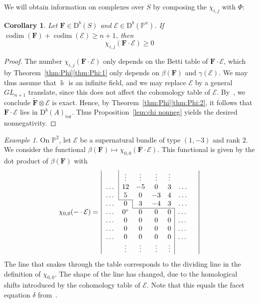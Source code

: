\documentclass[12pt]{amsart}
\newtheorem{cor}[lemma]{Corollary}
\theoremstyle{definition}
\theoremstyle{remark}
\newtheorem{example}[lemma]{Example}
\newcommand{\kk}{\Bbbk}
\newcommand{\codim}{\operatorname{codim}}
\newcommand{\PP}{\mathbb{P}}
\newcommand{\cE}{\mathcal{E}}
\newcommand{\FF}{\mathbf{F}}
\newcommand{\GL}{{GL}}
\newcommand{\zp}{\circ}
\newcommand{\DD}{\mathrm{D}}
\begin{document}
We will obtain information on complexes over $S$ by composing the $\chi_{i,j}$ with $\Phi$:

\begin{cor}\label{thm:categorified}\label{thm:categorified:1}  Let $\FF\in \DD^b(S)$ and $\cE\in \DD^b(\PP^n)$. If  $\codim(\FF)+\codim(\cE)\geq n+1$, then
\[
\chi_{i,j}(\FF\cdot \cE)\geq 0
\]
\end{cor}

\begin{proof}
The number $\chi_{i,j}(\FF\cdot \cE)$ only depends on the Betti table of $\FF\cdot \cE$, which by Theorem~\ref{thm:Phi}\eqref{thm:Phi:1} only depends on $\beta(\FF)$ and $\gamma(\cE)$.  We may thus assume that $\kk$ is an infinite field, and we may replace $\cE$ by a general $\GL_{n+1}$ translate, since this does not affect the cohomology table of $\cE$.  By~\cite[Theorem, p.\ 335]{miller-speyer}, we  conclude $\widetilde{\FF}\otimes \cE$ is exact.  Hence, by Theorem~\ref{thm:Phi}\eqref{thm:Phi:2}, it follows that $\FF\cdot \cE$ lies in $\DD^b(A)_{\text{tor}}$.  Thus Proposition~\ref{lem:chi nonneg} yields the desired nonnegativity.
\end{proof}


\begin{example}\label{ex:sup2}
On $\PP^2$, let $\cE$ be a supernatural bundle of type $(1,-3)$ and rank $2$.  
We consider the functional $\beta(\FF)\mapsto \chi_{0,0}(\FF\cdot \cE)$.  This functional is given by the dot product of $\beta(\FF)$ with
\[
\chi_{0,0}(-\cdot \cE)=
\left|
\begin{array}{ccccccc}
&\multicolumn{1}{|c}{\vdots}&\vdots&\vdots&\vdots&&\\
\dots&\multicolumn{1}{|c}{12}&-5&0&3&\dots\\
\dots&\multicolumn{1}{|c}{5}&0&-3&4&\dots\\ \cline{2-2}
\dots&{0}&\multicolumn{1}{|c}{3}&-4&3&\dots\\ \cline{3-5}
\dots&0^\zp&0&0&{0}&\multicolumn{1}{|c}{\dots}\\
\dots&0&0&0&0&\multicolumn{1}{|c}{\dots}\\
\dots&0&0&0&0&\multicolumn{1}{|c}{\dots}\\
\dots&0&0&0&0&\multicolumn{1}{|c}{\dots}\\
&\vdots&\vdots&\vdots&\vdots&\multicolumn{1}{|c}{}&\\
\end{array}
\right|
\]
The line that snakes through the table corresponds to the dividing line in the definition of $\chi_{0,0}$. The shape of the line has changed, due to the homological shifts introduced by the cohomology table of $\cE$.  Note that this equals the facet equation $\delta$ from~\cite[\S3]{eis-schrey-icm}.
\end{example}
\end{document}
